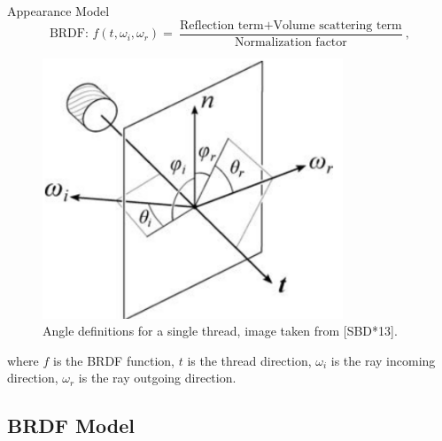 \documentclass{beamer}
\begin{document}
\begin{frame}{Appearance Model}
\begin{equation*} 
\mbox{BRDF: } f(t, \omega_i, \omega_r) =  \frac{\mbox{Reflection term} + \mbox{Volume scattering term}}{\mbox{Normalization factor}},
\end{equation*}

\begin{multicols}{2}

\begin{figure}[!htb]
    \centering
    \begin{minipage}{.5\textwidth}
        \centering
        \includegraphics[width=0.8\textwidth]{img/cloth_directions}
        \caption*{\tiny{Angle definitions for a single thread, image taken from [SBD*13].}}
    \end{minipage}%
\end{figure}

\vfill
\columnbreak
\vspace*{0.2cm}
\footnotesize{ where $f$ is the BRDF function, $t$ is the thread direction, $\omega_i$ is the ray incoming direction, $\omega_r$ is the ray outgoing direction. }
\end{multicols}

\end{frame}

\subsection{BRDF Model}
\end{document}
